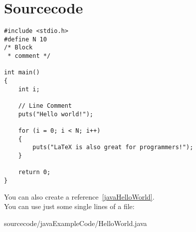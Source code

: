 \chapter{Sourcecode}


\begin{lstlisting}
#include <stdio.h>
#define N 10
/* Block
 * comment */

int main()
{
	int i;
	
	// Line Comment
	puts("Hello world!");
	
	for (i = 0; i < N; i++)
	{
		puts("LaTeX is also great for programmers!");
	}

	return 0;
}
\end{lstlisting}



You can also create a reference~\ref{javaHelloWorld}.\\

You can use just some single lines of a file:


	{sourcecode/javaExampleCode/HelloWorld.java}
